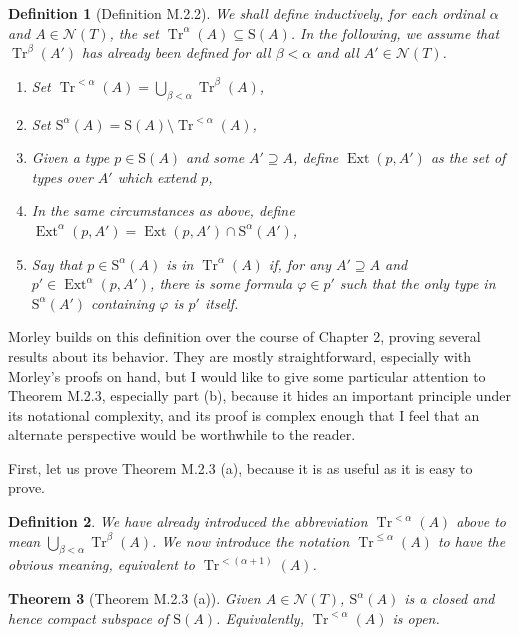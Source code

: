 \documentclass{article}
\newtheorem{theorem}{Theorem}[section]
\newtheorem{definition}[theorem]{Definition}
\theoremstyle{nonumberplain}
\newcommand{\calN}{\mathcal{N}}
\newcommand{\Stone}{\mathrm{S}}
\DeclareMathOperator{\Tr}{Tr}
\DeclareMathOperator{\Ext}{Ext}
\begin{document}
\begin{definition}[Definition M.2.2]\label{def:mrk}
We shall define inductively, for each ordinal $\alpha$ and $A \in \calN(T)$, the set $\Tr^\alpha(A) \subseteq \Stone(A)$. In the following, we assume that $\Tr^\beta(A')$ has already been defined for all $\beta < \alpha$ and all $A' \in \calN(T)$.
\begin{enumerate}[label=(\roman*)]
\item Set $\Tr^{<\alpha}(A) = \bigcup_{\beta < \alpha} \Tr^\beta(A)$,
\item Set $\Stone^\alpha(A) = \Stone(A) \setminus \Tr^{<\alpha}(A)$,
\item Given a type $p \in \Stone(A)$ and some $A' \supseteq A$, define $\Ext(p,A')$ as the set of types over $A'$ which extend $p$,
\item In the same circumstances as above, define $\Ext^\alpha(p,A') = \Ext(p,A') \cap \Stone^\alpha(A')$,
\item\label{item:mrk:def} Say that $p \in \Stone^\alpha(A)$ is in $\Tr^\alpha(A)$ if, for any $A' \supseteq A$ and $p' \in \Ext^\alpha(p,A')$, there is some formula $\varphi \in p'$ such that the only type in $\Stone^\alpha(A')$ containing $\varphi$ is $p'$ itself.
\end{enumerate}
\end{definition}

Morley builds on this definition over the course of Chapter 2, proving several results about its behavior. They are mostly straightforward, especially with Morley's proofs on hand, but I would like to give some particular attention to Theorem M.2.3, especially part (b), because it hides an important principle under its notational complexity, and its proof is complex enough that I feel that an alternate perspective would be worthwhile to the reader.

First, let us prove Theorem M.2.3 (a), because it is as useful as it is easy to prove.

\begin{definition}
We have already introduced the abbreviation $\Tr^{<\alpha}(A)$ above to mean $\bigcup_{\beta < \alpha} \Tr^\beta(A)$. We now introduce the notation $\Tr^{\leq\alpha}(A)$ to have the obvious meaning, equivalent to $\Tr^{<(\alpha+1)}(A)$.
\end{definition}

\begin{theorem}[Theorem M.2.3 (a)]\label{thm:compact}
Given $A \in \calN(T)$, $\Stone^\alpha(A)$ is a closed and hence compact subspace of $\Stone(A)$. Equivalently, $\Tr^{<\alpha}(A)$ is open.
\end{theorem}
\end{document}
